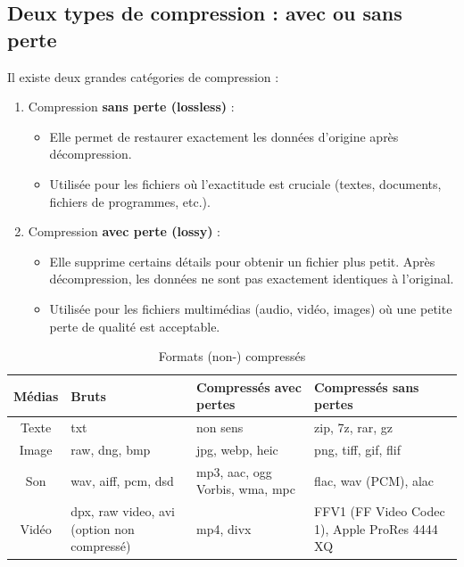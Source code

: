 \documentclass[11pt, a4paper]{book}
\begin{document}
\subsection{Deux types de compression : avec ou sans perte}
Il existe deux grandes catégories de compression :
\begin{enumerate}
    \item Compression \textbf{sans perte (lossless)} :
\begin{itemize}    
    \item Elle permet de restaurer exactement les données d'origine après décompression.
    \item Utilisée pour les fichiers où l'exactitude est cruciale (textes, documents, fichiers de programmes, etc.).
\end{itemize}
    \item Compression \textbf{avec perte (lossy)} :
\begin{itemize}
    \item Elle supprime certains détails pour obtenir un fichier plus petit. Après décompression, les données ne sont pas exactement identiques à l'original.
    \item Utilisée pour les fichiers multimédias (audio, vidéo, images) où une petite perte de qualité est acceptable.
\end{itemize}
\end{enumerate}

\begin{table}[h]
    \centering
    \begin{tabular}{|c|p{3cm}|p{3cm}|p{3cm}|}
        \hline
        \textbf{Médias} & \textbf{Bruts} & \textbf{Compressés avec pertes} & \textbf{Compressés sans pertes} \\
        \hline
        Texte & txt & non sens & zip, 7z, rar, gz \\
        \hline
        Image & raw, dng, bmp & jpg, webp, heic & png, tiff, gif, flif \\
        \hline
        Son & wav, aiff, pcm, dsd & mp3, aac, ogg Vorbis, wma, mpc & flac, wav (PCM), alac \\
        \hline
        Vidéo & dpx, raw video, avi  (option non compressé) & mp4, divx & FFV1 (FF Video Codec 1), Apple ProRes 4444 XQ \\
        \hline
    \end{tabular}
    \caption{Formats (non-) compressés}
    \label{tab:formats_medias}
\end{table}
\end{document}
